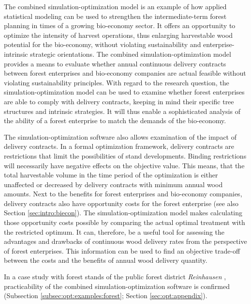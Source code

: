 The combined simulation-optimization model is an example of how applied statistical modeling can be used to strengthen the intermediate-term forest planning in times of a growing bio-economy sector. It offers an opportunity to optimize the intensity of harvest operations, thus enlarging harvestable wood potential for the bio-economy, without violating sustainability and enterprise-intrinsic strategic orientations. The combined si\-mu\-la\-tion-op\-ti\-mi\-za\-tion model provides a means to evaluate whether annual continuous delivery contracts between forest enterprises and bio-economy companies are actual feasible without violating sustainability principles. With regard to the research question, the si\-mu\-la\-tion-op\-ti\-mi\-za\-tion model can be used to examine whether forest enterprises are able to comply with delivery contracts, keeping in mind their specific tree structures and intrinsic strategies. It will thus enable a sophisticated analysis of the ability of a forest enterprise to match the demands of the bio-economy. 

The simulation-optimization software also allows examination of the impact of delivery contracts. In a formal optimization framework, delivery contracts are restrictions that limit the possibilities of stand developments. Binding restrictions will necessarily have negative effects on the objective value. This means, that the total harvestable volume in the time period of the optimization is either unaffected or decreased by delivery contracts with minimum annual wood amounts. Next to the benefits for forest enterprises and bio-economy companies, delivery contracts also have opportunity costs for the forest enterprise (see also Section \ref{sec:intro:biecon}). The si\-mu\-la\-tion-op\-ti\-mi\-za\-tion model makes calculating those opportunity costs possible by comparing the actual optimal treatment with the restricted optimum. It can, therefore, be a useful tool for assessing the advantages and drawbacks of continuous wood delivery rates from the perspective of forest enterprises. This information can be used to find an objective trade-off between the costs and the benefits of annual wood delivery quantity.

In a case study with forest stands of the public forest district \textit{Reinhausen} \citep{nlf_2017}, practicability of the combined si\-mu\-la\-tion-op\-ti\-mi\-za\-tion software is confirmed (Subsection \ref{subsec:opt:examples:forest}; Section \ref{sec:opt:appendix}).